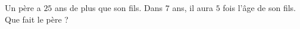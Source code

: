 \begin{exercice}\label{exoLineraire0004}

Un père a $25$ ans de plus que son fils. Dans $7$ ans, il aura $5$ fois l'âge de son fils. Que fait le père ?

\end{exercice}
